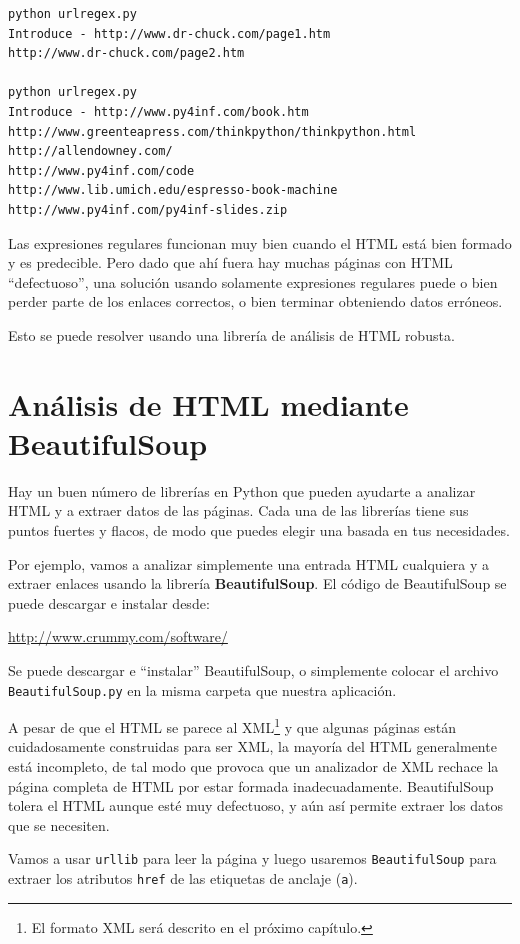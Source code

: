 \beforeverb
\begin{verbatim}
python urlregex.py 
Introduce - http://www.dr-chuck.com/page1.htm
http://www.dr-chuck.com/page2.htm

python urlregex.py 
Introduce - http://www.py4inf.com/book.htm
http://www.greenteapress.com/thinkpython/thinkpython.html
http://allendowney.com/
http://www.py4inf.com/code
http://www.lib.umich.edu/espresso-book-machine
http://www.py4inf.com/py4inf-slides.zip
\end{verbatim}
\afterverb
%
Las expresiones regulares funcionan muy bien cuando el HTML está bien formado
y es predecible. Pero dado que ahí fuera hay muchas páginas con HTML ``defectuoso'',
una solución usando solamente expresiones regulares puede o bien
perder parte de los enlaces correctos, o bien terminar obteniendo datos erróneos.

Esto se puede resolver usando una librería de análisis de HTML robusta.

\section{Análisis de HTML mediante BeautifulSoup}

Hay un buen número de librerías en Python que pueden ayudarte a analizar
HTML y a extraer datos de las páginas. Cada una de las librerías
tiene sus puntos fuertes y flacos, de modo que puedes elegir una
basada en tus necesidades.

Por ejemplo, vamos a analizar simplemente una entrada HTML cualquiera
y a extraer enlaces usando la librería {\bf BeautifulSoup}.
El código de BeautifulSoup se puede descargar e instalar
desde:

\url{http://www.crummy.com/software/}

Se puede descargar e ``instalar'' BeautifulSoup, o
simplemente colocar el archivo {\tt BeautifulSoup.py} en la
misma carpeta que nuestra aplicación.

A pesar de que el HTML se parece al XML\footnote{El formato XML será descrito
en el próximo capítulo.} y que algunas páginas están cuidadosamente
construidas para ser XML, la mayoría del HTML generalmente está
incompleto, de tal modo que provoca que un analizador de XML rechace la página completa de HTML
por estar formada inadecuadamente. BeautifulSoup tolera el HTML
aunque esté muy defectuoso, y aún así permite extraer los datos que se necesiten.

Vamos a usar {\tt urllib} para leer la página y luego usaremos
{\tt BeautifulSoup} para extraer los atributos {\tt href} de las
etiquetas de anclaje ({\tt a}).

